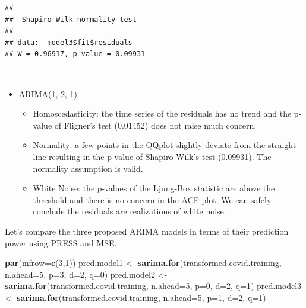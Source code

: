 \documentclass[]{article}
\newenvironment{Shaded}{\begin{snugshade}}{\end{snugshade}}
\newcommand{\DataTypeTok}[1]{\textcolor[rgb]{0.13,0.29,0.53}{#1}}
\newcommand{\DecValTok}[1]{\textcolor[rgb]{0.00,0.00,0.81}{#1}}
\newcommand{\KeywordTok}[1]{\textcolor[rgb]{0.13,0.29,0.53}{\textbf{#1}}}
\newcommand{\NormalTok}[1]{#1}
\newcommand{\OperatorTok}[1]{\textcolor[rgb]{0.81,0.36,0.00}{\textbf{#1}}}
\newcommand{\StringTok}[1]{\textcolor[rgb]{0.31,0.60,0.02}{#1}}
\providecommand{\tightlist}{%
  \setlength{\itemsep}{0pt}\setlength{\parskip}{0pt}}
\begin{document}
\begin{Shaded}
\end{Shaded}

\begin{verbatim}
## 
##  Shapiro-Wilk normality test
## 
## data:  model3$fit$residuals
## W = 0.96917, p-value = 0.09931
\end{verbatim}

\(\;\)

\begin{itemize}
\tightlist
\item
  ARIMA(1, 2, 1)

  \begin{itemize}
  \tightlist
  \item
    Homoscedasticity: the time series of the residuals has no trend and
    the p-value of Fligner's test (0.01452) does not raise much concern.
  \item
    Normality: a few points in the QQplot slightly deviate from the
    straight line resulting in the p-value of Shapiro-Wilk's test
    (0.09931). The normality assumption is valid.
  \item
    White Noise: the p-values of the Ljung-Box statistic are above the
    threshold and there is no concern in the ACF plot. We can safely
    conclude the residuals are realizations of white noise.
  \end{itemize}
\end{itemize}

\newpage

Let's compare the three proposed ARIMA models in terms of their
prediction power using PRESS and MSE.

\begin{Shaded}
\begin{Highlighting}[]
\KeywordTok{par}\NormalTok{(}\DataTypeTok{mfrow=}\KeywordTok{c}\NormalTok{(}\DecValTok{3}\NormalTok{,}\DecValTok{1}\NormalTok{))}
\NormalTok{pred.model1 <-}\StringTok{ }\KeywordTok{sarima.for}\NormalTok{(transformed.covid.training, }\DataTypeTok{n.ahead=}\DecValTok{5}\NormalTok{, }\DataTypeTok{p=}\DecValTok{3}\NormalTok{, }\DataTypeTok{d=}\DecValTok{2}\NormalTok{, }\DataTypeTok{q=}\DecValTok{0}\NormalTok{)}
\NormalTok{pred.model2 <-}\StringTok{ }\KeywordTok{sarima.for}\NormalTok{(transformed.covid.training, }\DataTypeTok{n.ahead=}\DecValTok{5}\NormalTok{, }\DataTypeTok{p=}\DecValTok{0}\NormalTok{, }\DataTypeTok{d=}\DecValTok{2}\NormalTok{, }\DataTypeTok{q=}\DecValTok{1}\NormalTok{)}
\NormalTok{pred.model3 <-}\StringTok{ }\KeywordTok{sarima.for}\NormalTok{(transformed.covid.training, }\DataTypeTok{n.ahead=}\DecValTok{5}\NormalTok{, }\DataTypeTok{p=}\DecValTok{1}\NormalTok{, }\DataTypeTok{d=}\DecValTok{2}\NormalTok{, }\DataTypeTok{q=}\DecValTok{1}\NormalTok{)}
\end{Highlighting}
\end{Shaded}
\end{document}
